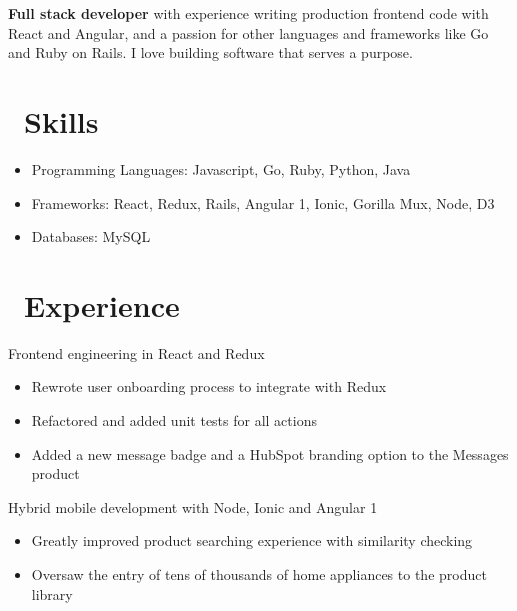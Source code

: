 \documentclass{resume}
\begin{document}


  
 \smallskip

\textbf{Full stack developer} with experience writing production frontend code with React and Angular, and a passion for other languages and frameworks like Go and Ruby on Rails. I love building software that serves a purpose.

\section{\faCogs\ Skills}
\begin{itemize}[parsep=0.5ex]
  \item Programming Languages: Javascript, Go, Ruby, Python, Java
  \item Frameworks: React, Redux, Rails, Angular 1, Ionic, Gorilla Mux, Node, D3
  \item Databases: MySQL
\end{itemize}

\section{\faUsers\ Experience}
\space
Frontend engineering in React and Redux
\begin{itemize}
  \item Rewrote user onboarding process to integrate with Redux
  \item Refactored and added unit tests for all actions
  \item Added a new message badge and a HubSpot branding option to the Messages product
\end{itemize}

 \space
Hybrid mobile development with Node, Ionic and Angular 1
\begin{itemize}
  \item Greatly improved product searching experience with similarity checking
  \item Oversaw the entry of tens of thousands of home appliances to the product library 
\end{itemize}
\end{document}
